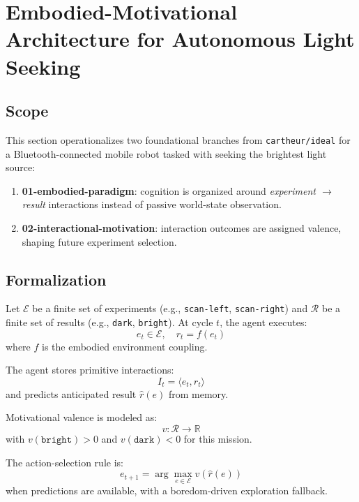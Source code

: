 \section{Embodied-Motivational Architecture for Autonomous Light Seeking}
\label{sec:embodied_motivational_light_seeker}

\subsection{Scope}
This section operationalizes two foundational branches from \texttt{cartheur/ideal} for a Bluetooth-connected mobile robot tasked with seeking the brightest light source:
\begin{enumerate}
\item \textbf{01-embodied-paradigm}: cognition is organized around \textit{experiment $\rightarrow$ result} interactions instead of passive world-state observation.
\item \textbf{02-interactional-motivation}: interaction outcomes are assigned valence, shaping future experiment selection.
\end{enumerate}

\subsection{Formalization}
Let $\mathcal{E}$ be a finite set of experiments (e.g., \texttt{scan-left}, \texttt{scan-right}) and $\mathcal{R}$ be a finite set of results (e.g., \texttt{dark}, \texttt{bright}).
At cycle $t$, the agent executes:
\begin{equation}
e_t \in \mathcal{E}, \quad r_t = f(e_t)
\end{equation}
where $f$ is the embodied environment coupling.

The agent stores primitive interactions:
\begin{equation}
I_t = \langle e_t, r_t \rangle
\end{equation}
and predicts anticipated result $\hat{r}(e)$ from memory.

Motivational valence is modeled as:
\begin{equation}
v: \mathcal{R} \rightarrow \mathbb{R}
\end{equation}
with $v(\texttt{bright}) > 0$ and $v(\texttt{dark}) < 0$ for this mission.

The action-selection rule is:
\begin{equation}
e_{t+1} = \arg\max_{e \in \mathcal{E}} v(\hat{r}(e))
\end{equation}
when predictions are available, with a boredom-driven exploration fallback.

